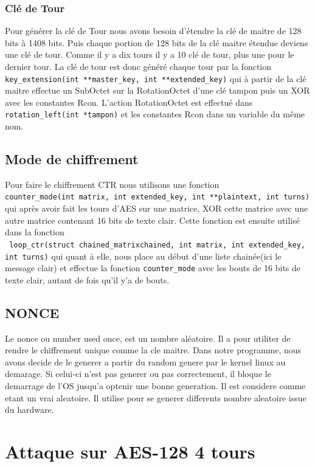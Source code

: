 \documentclass[10pt, a4paper]{report}
\begin{document}
	\subsection{Clé de Tour}
	Pour générer la clé de Tour nous avons besoin d'étendre la clé de maitre de 128 bits à 1408 bits. Puis chaque portion de 128 bits de la clé maitre étendue deviens une clé de tour. Comme il y a dix tours il y a 10 clé de tour, plus une pour le dernier tour. La clé de tour est donc généré chaque tour par la fonction \verb|key_extension(int **master_key, int **extended_key)| qui à partir de la clé maitre effectue un SubOctet sur la RotationOctet d'une clé tampon puis un XOR avec les constantes Rcon. L'action RotationOctet est effectué dans \verb|rotation_left(int *tampon)| et les constantes Rcon dans un variable du même nom.
	
	\section{Mode de chiffrement}
	Pour faire le chiffrement CTR nous utilisons une fonction\\ \verb|counter_mode(int matrix, int extended_key, int **plaintext, int turns)| qui après avoir fait les tours d'AES sur une matrice, XOR cette matrice avec une autre matrice contenant 16 bits de texte clair. Cette fonction est ensuite utilisé dans la fonction \\
	\verb| loop_ctr(struct chained_matrixchained, int matrix, int extended_key,| \verb|int turns)| qui quant à elle, nous place au début d'une liste chainée(ici le message clair) et effectue la fonction \verb|counter_mode| avec les bouts de 16 bits de texte clair, autant de fois qu'il y'a de bouts.
	
	\section{NONCE}
	Le nonce ou number used once, est un nombre aléatoire. Il a pour utiliter de rendre le chiffrement unique comme la cle maitre. Dans notre programme, nous avons decide de le generer a partir du random genere par le kernel linux au demarage. Si celui-ci n'est pas generer ou pas correctement, il bloque le demarrage de l'OS jusqu'a optenir une bonne generation. Il est considere comme etant un vrai aleatoire. Il utilise pour se generer differents nombre aleatoire issue du hardware. 
	
	\chapter{Attaque sur AES-128 4 tours}
\end{document}
